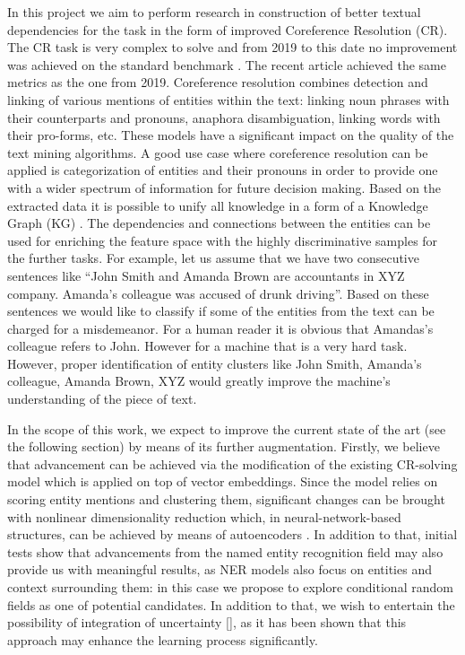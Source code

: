 In this project we aim to perform research in construction of better textual dependencies for the task in the form of improved Coreference Resolution (CR). The CR task is very complex to solve and from 2019 to this date \cite{spanbert-Joshi2020} no improvement was achieved on the standard benchmark \cite{ontonotes5-Weischedel2013}. The recent article \cite{cr-Toshniwal2020} achieved the same metrics as the one from 2019. Coreference resolution combines detection and linking of various mentions of entities within the text: linking noun phrases with their counterparts and pronouns, anaphora disambiguation, linking words with their pro-forms, etc.  These models have a significant impact on the quality of the text mining algorithms. A good use case where  coreference resolution can be applied is categorization of entities and their pronouns in order to provide one with a wider spectrum of information for future decision making. Based on the extracted data it is possible to unify all knowledge in a form of a Knowledge Graph (KG) \cite{kg-Wang2017}. The dependencies and connections between the entities can be used for enriching the feature space with the highly discriminative samples for the further tasks. 
For example, let us assume that we have two consecutive sentences like “John Smith and Amanda Brown are accountants in XYZ company. Amanda’s colleague was accused of drunk driving”. Based on these sentences we would like to classify if some of the entities from the text can be charged for a misdemeanor. For a human reader it is obvious that Amandas’s colleague refers to John. However for a machine that is a very hard task. However, proper identification of entity clusters like {John Smith, Amanda’s colleague}, {Amanda Brown}, {XYZ} would greatly improve the machine’s understanding of the piece of text.

In the scope of this work, we expect to improve the current state of the art (see the following section) by means of its further augmentation. Firstly, we believe that advancement can be achieved via the modification of the existing CR-solving model which is applied on top of vector embeddings. Since the model relies on scoring entity mentions and clustering them, significant changes can be brought with nonlinear dimensionality reduction which, in neural-network-based structures, can be achieved by means of autoencoders \cite{autoencoders-Zabalza2016,autoencoders-Sahay2019}. In addition to that, initial tests show that advancements from the named entity recognition field may also provide us with meaningful results, as NER models also focus on entities and context surrounding them: in this case we propose to explore conditional random fields \cite{ner-Strakova2019,ner-Zhanming2019} as one of potential candidates. In addition to that, we wish to entertain the possibility of integration of uncertainty [], as it has been shown that this approach may enhance the learning process significantly.


